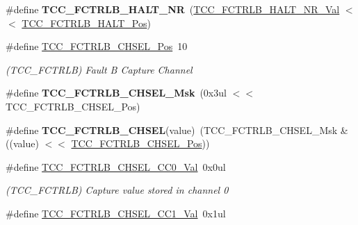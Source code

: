 \begin{DoxyCompactItemize}
\item 
\hypertarget{group___s_a_m_l21___t_c_c_ga712b13e549b9c44b8c14a7046beddf53}{}\#define {\bfseries T\+C\+C\+\_\+\+F\+C\+T\+R\+L\+B\+\_\+\+H\+A\+L\+T\+\_\+\+N\+R}~(\hyperlink{group___s_a_m_l21___t_c_c_ga5bb4e17a35b13b64016009f9941b64a7}{T\+C\+C\+\_\+\+F\+C\+T\+R\+L\+B\+\_\+\+H\+A\+L\+T\+\_\+\+N\+R\+\_\+\+Val}        $<$$<$ \hyperlink{group___s_a_m_l21___t_c_c_gab9e9865f632211214654163efcbd704d}{T\+C\+C\+\_\+\+F\+C\+T\+R\+L\+B\+\_\+\+H\+A\+L\+T\+\_\+\+Pos})\label{group___s_a_m_l21___t_c_c_ga712b13e549b9c44b8c14a7046beddf53}

\item 
\hypertarget{group___s_a_m_l21___t_c_c_ga6080af4e19870994e6c7f4170fb48da7}{}\#define \hyperlink{group___s_a_m_l21___t_c_c_ga6080af4e19870994e6c7f4170fb48da7}{T\+C\+C\+\_\+\+F\+C\+T\+R\+L\+B\+\_\+\+C\+H\+S\+E\+L\+\_\+\+Pos}~10\label{group___s_a_m_l21___t_c_c_ga6080af4e19870994e6c7f4170fb48da7}

\begin{DoxyCompactList}\small\item\em (T\+C\+C\+\_\+\+F\+C\+T\+R\+L\+B) Fault B Capture Channel \end{DoxyCompactList}\item 
\hypertarget{group___s_a_m_l21___t_c_c_ga49572fd974626432819753c1deb12e95}{}\#define {\bfseries T\+C\+C\+\_\+\+F\+C\+T\+R\+L\+B\+\_\+\+C\+H\+S\+E\+L\+\_\+\+Msk}~(0x3ul $<$$<$ T\+C\+C\+\_\+\+F\+C\+T\+R\+L\+B\+\_\+\+C\+H\+S\+E\+L\+\_\+\+Pos)\label{group___s_a_m_l21___t_c_c_ga49572fd974626432819753c1deb12e95}

\item 
\hypertarget{group___s_a_m_l21___t_c_c_ga0dd6d7082a5ff064ced13550278da6a7}{}\#define {\bfseries T\+C\+C\+\_\+\+F\+C\+T\+R\+L\+B\+\_\+\+C\+H\+S\+E\+L}(value)~(T\+C\+C\+\_\+\+F\+C\+T\+R\+L\+B\+\_\+\+C\+H\+S\+E\+L\+\_\+\+Msk \& ((value) $<$$<$ \hyperlink{group___s_a_m_l21___t_c_c_ga6080af4e19870994e6c7f4170fb48da7}{T\+C\+C\+\_\+\+F\+C\+T\+R\+L\+B\+\_\+\+C\+H\+S\+E\+L\+\_\+\+Pos}))\label{group___s_a_m_l21___t_c_c_ga0dd6d7082a5ff064ced13550278da6a7}

\item 
\hypertarget{group___s_a_m_l21___t_c_c_gaccfd653c2d575d053cd2f989c5d5e7a6}{}\#define \hyperlink{group___s_a_m_l21___t_c_c_gaccfd653c2d575d053cd2f989c5d5e7a6}{T\+C\+C\+\_\+\+F\+C\+T\+R\+L\+B\+\_\+\+C\+H\+S\+E\+L\+\_\+\+C\+C0\+\_\+\+Val}~0x0ul\label{group___s_a_m_l21___t_c_c_gaccfd653c2d575d053cd2f989c5d5e7a6}

\begin{DoxyCompactList}\small\item\em (T\+C\+C\+\_\+\+F\+C\+T\+R\+L\+B) Capture value stored in channel 0 \end{DoxyCompactList}\item 
\hypertarget{group___s_a_m_l21___t_c_c_gae2863c63db3b6682fa4c810160ea02c8}{}\#define \hyperlink{group___s_a_m_l21___t_c_c_gae2863c63db3b6682fa4c810160ea02c8}{T\+C\+C\+\_\+\+F\+C\+T\+R\+L\+B\+\_\+\+C\+H\+S\+E\+L\+\_\+\+C\+C1\+\_\+\+Val}~0x1ul\label{group___s_a_m_l21___t_c_c_gae2863c63db3b6682fa4c810160ea02c8}


\end{DoxyCompactItemize}
